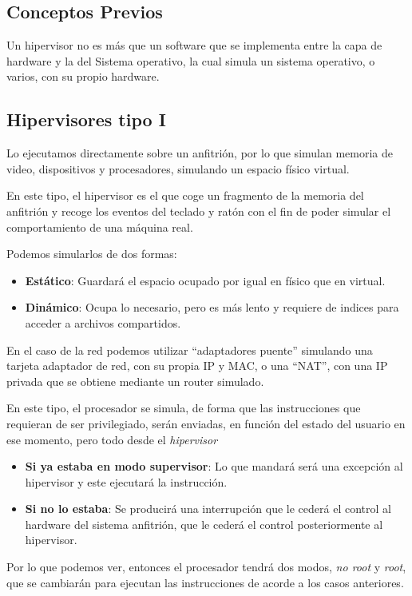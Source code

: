 \subsection{Conceptos Previos}
\noindent Un hipervisor no es más que un software que se implementa entre la capa de hardware y la del Sistema operativo, la cual simula un sistema operativo, o varios, con su propio hardware.
\subsection{Hipervisores tipo I}
\noindent Lo ejecutamos directamente sobre un anfitrión, por lo que simulan memoria de video, dispositivos y procesadores, simulando un espacio físico virtual.
\par \noindent En este tipo, el hipervisor es el que coge un fragmento de la memoria del anfitrión y recoge los eventos del teclado y ratón con el fin de poder simular el comportamiento de una máquina real.
\par \noindent Podemos simularlos de dos formas:
\begin{itemize}
        \item \textbf{Estático}: Guardará el espacio ocupado por igual en físico que en virtual.
        \item \textbf{Dinámico}: Ocupa lo necesario, pero es más lento y requiere de indices para acceder a archivos compartidos.
\end{itemize}
\noindent En el caso de la red podemos utilizar ``adaptadores puente'' simulando una tarjeta adaptador de red, con su propia IP y MAC, o una ``NAT'', con una IP privada que se obtiene mediante un router simulado.
\par \noindent En este tipo, el procesador se simula, de forma que las instrucciones que requieran de ser privilegiado, serán enviadas, en función del estado del usuario en ese momento, pero todo desde el \textit{hipervisor}
\begin{itemize}
        \item \textbf{Si ya estaba en modo supervisor}: Lo que mandará será una excepción al hipervisor y este ejecutará la instrucción.
        \item \textbf{Si no lo estaba}: Se producirá una interrupción que le cederá el control al hardware del sistema anfitrión, que le cederá el control posteriormente al hipervisor.
\end{itemize}
\noindent Por lo que podemos ver, entonces el procesador tendrá dos modos, \textit{no root} y \textit{root}, que se cambiarán para ejecutan las instrucciones de acorde a los casos anteriores.
